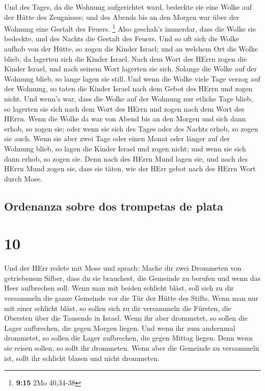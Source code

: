  Und des Tages, da die Wohnung aufgerichtet ward,
bedeckte sie eine Wolke auf der Hütte des Zeugnisses; und des Abends bis
an den Morgen war über der Wohnung eine Gestalt des Feuers. \footnote{\textbf{9:15}
  2Mo 40,34-38}  Also geschah's immerdar, dass die Wolke
sie bedeckte, und des Nachts die Gestalt des Feuers.  Und
so oft sich die Wolke aufhob von der Hütte, so zogen die Kinder Israel;
und an welchem Ort die Wolke blieb, da lagerten sich die Kinder Israel.
 Nach dem Wort des HErrn zogen die Kinder Israel, und
nach seinem Wort lagerten sie sich. Solange die Wolke auf der Wohnung
blieb, so lange lagen sie still.  Und wenn die Wolke
viele Tage verzog auf der Wohnung, so taten die Kinder Israel nach dem
Gebot des HErrn und zogen nicht.  Und wenn's war, dass
die Wolke auf der Wohnung nur etliche Tage blieb, so lagerten sie sich
nach dem Wort des HErrn und zogen nach dem Wort des HErrn.
 Wenn die Wolke da war von Abend bis an den Morgen und
sich dann erhob, so zogen sie; oder wenn sie sich des Tages oder des
Nachts erhob, so zogen sie auch.  Wenn sie aber zwei Tage
oder einen Monat oder länger auf der Wohnung blieb, so lagen die Kinder
Israel und zogen nicht; und wenn sie sich dann erhob, so zogen sie.
 Denn nach des HErrn Mund lagen sie, und nach des HErrn
Mund zogen sie, dass sie täten, wie der HErr gebot nach des HErrn Wort
durch Mose.

\hypertarget{ordenanza-sobre-dos-trompetas-de-plata}{%
\subsection{Ordenanza sobre dos trompetas de
plata}\label{ordenanza-sobre-dos-trompetas-de-plata}}

\hypertarget{section-9}{%
\section{10}\label{section-9}}

 Und der HErr redete mit Mose und sprach: 
Mache dir zwei Drommeten von getriebenem Silber, dass du sie brauchest,
die Gemeinde zu berufen und wenn das Heer aufbrechen soll.
 Wenn man mit beiden schlicht bläst, soll sich zu dir
versammeln die ganze Gemeinde vor die Tür der Hütte des Stifts.
 Wenn man nur mit einer schlicht bläst, so sollen sich zu
dir versammeln die Fürsten, die Obersten über die Tausende in Israel.
 Wenn ihr aber drommetet, so sollen die Lager aufbrechen,
die gegen Morgen liegen.  Und wenn ihr zum andernmal
drommetet, so sollen die Lager aufbrechen, die gegen Mittag liegen. Denn
wenn sie reisen sollen, so sollt ihr drommeten.  Wenn aber
die Gemeinde zu versammeln ist, sollt ihr schlicht blasen und nicht
drommeten.

